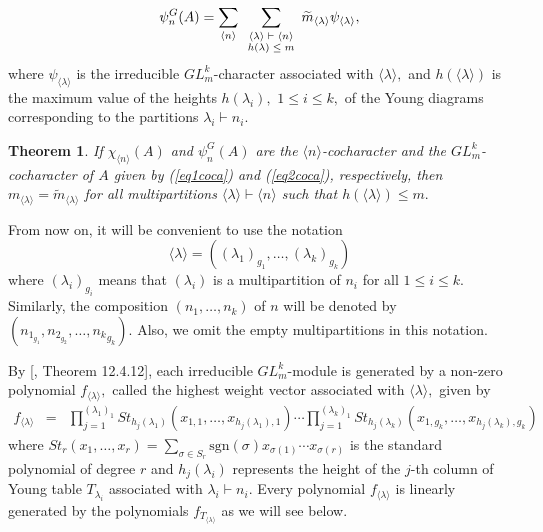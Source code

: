 \documentclass{amsart}
\newcommand{\gen}[1]{\ensuremath{\langle{#1}\rangle}}
\newtheorem{teorema}{Theorem}[section]
\numberwithin{equation}{section}
\begin{document}
 \begin{equation} \label{eq2coca}
\psi_n^{G}(A)=  \displaystyle \sum_{\langle n\rangle  } \underset{\scriptsize{\begin{array}{c}
\gen{\lambda}\vdash \gen{n} \\
			h( \lambda )\leq m
	\end{array}}}{\sum} \widetilde{m}_{\gen{\lambda}}\psi_{\gen{\lambda}},
\end{equation}  
where $\psi_{\langle \lambda \rangle}$ is the irreducible $GL_m^{k}$-character associated with $\langle \lambda \rangle,$ and $h(\langle \lambda \rangle)$ is the maximum value of the heights $h(\lambda_i),$ $1 \le i \le k,$ of the Young diagrams corresponding to the partitions $\lambda_i\vdash n_i.$ 

\begin{teorema}\label{multip}
If $\chi_{\langle n \rangle}(A)$ and $\psi_n^{G}(A)$ are the $\langle n \rangle$-cocharacter and the $GL_m^{k}$-cocharacter of $A$ given by (\ref{eq1coca}) and (\ref{eq2coca}), respectively, then $m_{\langle \lambda \rangle}=\tilde{m}_{\langle \lambda \rangle}$ for all multipartitions $\langle \lambda\rangle\vdash \langle n \rangle$ such that $h(\langle \lambda \rangle)\le m.$
	
\end{teorema}

From now on, it will be convenient to use the notation  
\begin{equation}\label{eq 3-}
\langle \lambda \rangle = ((\lambda_{1})_{{g_{1}}}, \ldots , (\lambda_{k})_{g_{k}})
\end{equation}
where  $(\lambda_{i})_{{g_{i}}}$  means that $(\lambda_{i})$ is a multipartition of $n_i$ for all $1 \le i \le k.$ Similarly, the composition $(n_1, \ldots, n_{k})$ of $n$ will be denoted by $(n_{1_{g_1}},n_{2_{g_2}}, \ldots, {n_{k}}_{g_k})$. Also,
we omit the empty multipartitions in this notation.

By [\cite{Dr}, Theorem 12.4.12], each irreducible $GL^{k}_m$-module is generated by a non-zero polynomial $f_{\langle \lambda \rangle},$  called the
highest weight vector associated with $\langle \lambda \rangle,$ given by
$$\begin{array}{cclc}	
	
	f_{{\langle \lambda \rangle}} &=&\prod\limits_{j=1}^{(\lambda_1)_1}St_{{h_j}(\lambda_1)}(x_{1,1}, \ldots, x_{{h_j}(\lambda_1),1})  \cdots \prod\limits_{j=1}^{(\lambda_{k})_1}St_{{h_j}(\lambda_{k})}(x_{1,g_k}, \ldots, x_{{h_j}(\lambda_{k}),g_k})
\end{array}$$
where $St_r(x_1, \ldots , x_r) = \sum\limits_{\sigma \in S_r}\mbox{sgn}(\sigma)x_{\sigma(1)}\cdots x_{\sigma(r)}$ is the standard polynomial of degree $r$ and $h_j(\lambda_{i})$  represents the height of the $j$-th column of Young table $T_{\lambda_{i}}$ associated  with $\lambda_i\vdash n_i.$ Every polynomial $f_{\langle \lambda \rangle}$ is linearly generated by the polynomials $f_{T_{\langle \lambda \rangle}}$ as we will see below. %
\end{document}

